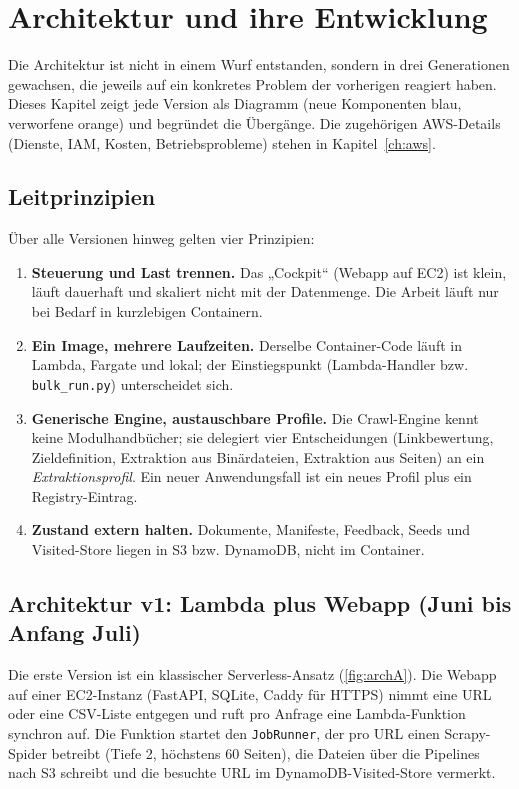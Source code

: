 \chapter{Architektur und ihre Entwicklung}\label{ch:architektur}

Die Architektur ist nicht in einem Wurf entstanden, sondern in drei Generationen gewachsen, die jeweils auf ein konkretes Problem der vorherigen reagiert haben. Dieses Kapitel zeigt jede Version als Diagramm (neue Komponenten blau, verworfene orange) und begründet die Übergänge. Die zugehörigen AWS-Details (Dienste, IAM, Kosten, Betriebsprobleme) stehen in Kapitel~\ref{ch:aws}.

\section{Leitprinzipien}
Über alle Versionen hinweg gelten vier Prinzipien:
\begin{enumerate}
  \item \textbf{Steuerung und Last trennen.} Das „Cockpit“ (Webapp auf EC2) ist klein, läuft dauerhaft und skaliert nicht mit der Datenmenge. Die Arbeit läuft nur bei Bedarf in kurzlebigen Containern.
  \item \textbf{Ein Image, mehrere Laufzeiten.} Derselbe Container-Code läuft in Lambda, Fargate und lokal; der Einstiegspunkt (Lambda-Handler bzw. \texttt{bulk\_run.py}) unterscheidet sich.
  \item \textbf{Generische Engine, austauschbare Profile.} Die Crawl-Engine kennt keine Modulhandbücher; sie delegiert vier Entscheidungen (Linkbewertung, Zieldefinition, Extraktion aus Binärdateien, Extraktion aus Seiten) an ein \emph{Extraktionsprofil}. Ein neuer Anwendungsfall ist ein neues Profil plus ein Registry-Eintrag.
  \item \textbf{Zustand extern halten.} Dokumente, Manifeste, Feedback, Seeds und Visited-Store liegen in S3 bzw. DynamoDB, nicht im Container.
\end{enumerate}

\section{Architektur v1: Lambda plus Webapp (Juni bis Anfang Juli)}\label{sec:arch-v1}
Die erste Version ist ein klassischer Serverless-Ansatz (\cref{fig:archA}). Die Webapp auf einer EC2-Instanz (FastAPI, SQLite, Caddy für HTTPS) nimmt eine URL oder eine CSV-Liste entgegen und ruft pro Anfrage eine Lambda-Funktion synchron auf. Die Funktion startet den \texttt{JobRunner}, der pro URL einen Scrapy-Spider betreibt (Tiefe 2, höchstens 60 Seiten), die Dateien über die Pipelines nach S3 schreibt und die besuchte URL im DynamoDB-Visited-Store vermerkt.

